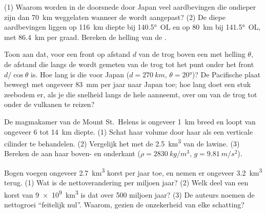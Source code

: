 \begin{exercise}[$\star\star$]\label{exo:g12:subduction-magmatism:11}
(1) Waarom worden in de doorsnede door Japan veel aardbevingen die ondieper zijn dan
\qty{70}{km} weggelaten wanneer de  wordt aangepast? (2) De diepe aardbevingen liggen
op \qty{116}{km} diepte bij \ang{140.5}~OL en op \qty{80}{km} bij \ang{141.5}~OL, met
\qty{86.4}{km} per graad. Bereken de helling van de .
\end{exercise}

\begin{exercise}[$\star\star\star$]\label{exo:g12:subduction-magmatism:12}
Toon aan dat, voor een front op afstand $d$ van de trog boven een  met helling
$\theta$, de afstand die langs de  wordt gemeten van de trog tot het punt
onder het front $d/\cos\theta$ is. Hoe lang is die voor Japan ($d = \qty{270}{km}$,
$\theta = \ang{20}$)? De Pacifische plaat beweegt met ongeveer \qty{83}{mm} per jaar naar
Japan toe; hoe lang doet een stuk zeebodem er, als je die snelheid langs de hele  aanneemt, over om van de trog tot onder de
vulkanen te reizen?
\end{exercise}

\begin{exercise}[$\star\star\star$]\label{exo:g12:subduction-magmatism:13}
De magmakamer van de Mount St.~Helens is ongeveer \qty{1}{km} breed en loopt
van ongeveer 6 tot \qty{14}{km} diepte. (1) Schat haar volume door haar als een verticale cilinder
te behandelen. (2) Vergelijk het met de \qty{2.5}{km^3} van de lawine.
(3) Bereken de  aan haar boven- en onderkant ($\rho =
\qty{2830}{kg/m^3}$, $g = \qty{9.81}{m/s^2}$).
\end{exercise}

\begin{exercise}[$\star\star\star$]\label{exo:g12:subduction-magmatism:14}
Bogen voegen ongeveer \qty{2.7}{km^3} korst per jaar toe, en  nemen er
ongeveer \qty{3.2}{km^3} terug. (1) Wat is de nettoverandering per miljoen jaar?
(2) Welk deel van een korst van \qty{9e9}{km^3} is dat over 500 miljoen jaar?
(3) De auteurs noemen de nettogroei ``feitelijk nul''. Waarom, gezien
de onzekerheid van elke schatting?
\end{exercise}

